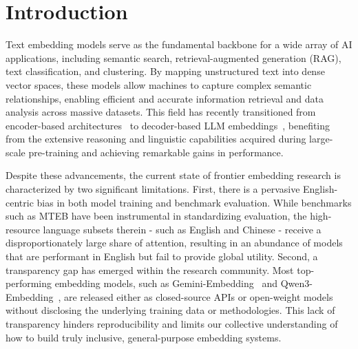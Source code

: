 \section{Introduction}

Text embedding models serve as the fundamental backbone for a wide array of AI applications, including semantic search, retrieval-augmented generation (RAG), text classification, and clustering. By mapping unstructured text into dense vector spaces, these models allow machines to capture complex semantic relationships, enabling efficient and accurate information retrieval and data analysis across massive datasets. This field has recently transitioned from encoder-based architectures~\citep{2019BERT,2019RoBERTa,2020XLM-R} to decoder-based LLM embeddings~\citep{2025Qwen3-Embedding,2025NV-Embed,2025f2llm}, benefiting from the extensive reasoning and linguistic capabilities acquired during large-scale pre-training and achieving remarkable gains in performance.

Despite these advancements, the current state of frontier embedding research is characterized by two significant limitations. First, there is a pervasive English-centric bias in both model training and benchmark evaluation. While benchmarks such as MTEB have been instrumental in standardizing evaluation, the high-resource language subsets therein - such as English and Chinese - receive a disproportionately large share of attention, resulting in an abundance of models that are performant in English but fail to provide global utility. Second, a transparency gap has emerged within the research community. Most top-performing embedding models, such as Gemini-Embedding~\citep{2025Gemini-Embedding} and Qwen3-Embedding~\citep{2025Qwen3-Embedding}, are released either as closed-source APIs or open-weight models without disclosing the underlying training data or methodologies. This lack of transparency hinders reproducibility and limits our collective understanding of how to build truly inclusive, general-purpose embedding systems.


